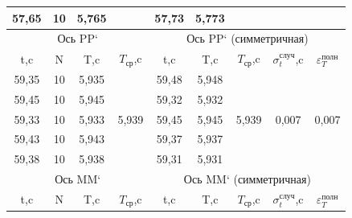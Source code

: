 \begin{table}[h!]
\begin{tabular}{|cccc|ccccc|}
\multicolumn{1}{|c|}{57,65} &
  \multicolumn{1}{c|}{10} &
  \multicolumn{1}{c|}{5,765} &
   &
  \multicolumn{1}{c|}{57,73} &
  \multicolumn{1}{c|}{5,773} &
  \multicolumn{1}{c|}{} &
  \multicolumn{1}{c|}{} &
   \\ \hline
\multicolumn{4}{|c|}{Ось PP`} &
  \multicolumn{5}{c|}{Ось PP` (симметричная)} \\ \hline
\multicolumn{1}{|c|}{t,c} &
  \multicolumn{1}{c|}{N} &
  \multicolumn{1}{c|}{T,c} &
  $T_\text{ср}$,c &
  \multicolumn{1}{c|}{t,c} &
  \multicolumn{1}{c|}{T,c} &
  \multicolumn{1}{c|}{$T_\text{ср}$,c} &
  \multicolumn{1}{c|}{$\sigma_t^\text{случ}$,c} &
  $\varepsilon_T^\text{полн}$ \\ \hline
\multicolumn{1}{|c|}{59,35} &
  \multicolumn{1}{c|}{10} &
  \multicolumn{1}{c|}{5,935} &
  \multirow{5}{*}{5,939} &
  \multicolumn{1}{c|}{59,48} &
  \multicolumn{1}{c|}{5,948} &
  \multicolumn{1}{c|}{\multirow{5}{*}{5,939}} &
  \multicolumn{1}{c|}{\multirow{5}{*}{0,007}} &
  \multirow{5}{*}{0,007} \\ \cline{1-3} \cline{5-6}
\multicolumn{1}{|c|}{59,45} &
  \multicolumn{1}{c|}{10} &
  \multicolumn{1}{c|}{5,945} &
   &
  \multicolumn{1}{c|}{59,32} &
  \multicolumn{1}{c|}{5,932} &
  \multicolumn{1}{c|}{} &
  \multicolumn{1}{c|}{} &
   \\ \cline{1-3} \cline{5-6}
\multicolumn{1}{|c|}{59,33} &
  \multicolumn{1}{c|}{10} &
  \multicolumn{1}{c|}{5,933} &
   &
  \multicolumn{1}{c|}{59,45} &
  \multicolumn{1}{c|}{5,945} &
  \multicolumn{1}{c|}{} &
  \multicolumn{1}{c|}{} &
   \\ \cline{1-3} \cline{5-6}
\multicolumn{1}{|c|}{59,43} &
  \multicolumn{1}{c|}{10} &
  \multicolumn{1}{c|}{5,943} &
   &
  \multicolumn{1}{c|}{59,37} &
  \multicolumn{1}{c|}{5,937} &
  \multicolumn{1}{c|}{} &
  \multicolumn{1}{c|}{} &
   \\ \cline{1-3} \cline{5-6}
\multicolumn{1}{|c|}{59,38} &
  \multicolumn{1}{c|}{10} &
  \multicolumn{1}{c|}{5,938} &
   &
  \multicolumn{1}{c|}{59,31} &
  \multicolumn{1}{c|}{5,931} &
  \multicolumn{1}{c|}{} &
  \multicolumn{1}{c|}{} &
   \\ \hline
\multicolumn{4}{|c|}{Ось MM`} &
  \multicolumn{5}{c|}{Ось MM` (симметричная)} \\ \hline
\multicolumn{1}{|c|}{t,c} &
  \multicolumn{1}{c|}{N} &
  \multicolumn{1}{c|}{T,c} &
  $T_\text{ср}$,c &
  \multicolumn{1}{c|}{t,c} &
  \multicolumn{1}{c|}{T,c} &
  \multicolumn{1}{c|}{$T_\text{ср}$,c} &
  \multicolumn{1}{c|}{$\sigma_t^\text{случ}$,c} &
  $\varepsilon_T^\text{полн}$ \\ \hline

\end{tabular}
\end{table}
